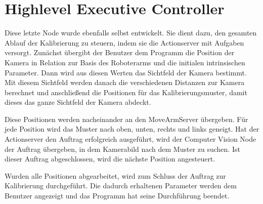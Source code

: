 \section{Highlevel Executive Controller} %
\label{sec:calibrationcontroller}
Diese letzte Node wurde ebenfalls selbst entwickelt. Sie dient dazu, den gesamten Ablauf der Kalibrierung zu steuern, indem sie die Actionserver mit Aufgaben versorgt. Zunächst übergibt der Benutzer dem Programm die Position der Kamera in Relation zur Basis des Roboterarms und die initialen intrinsischen Parameter. Dann wird aus diesen Werten das Sichtfeld der Kamera bestimmt. Mit diesem Sichtfeld werden danach die verschiedenen Distanzen zur Kamera berechnet und anschließend die Positionen für das Kalibrierungsmuster, damit dieses das ganze Sichtfeld der Kamera abdeckt.

Diese Positionen werden nacheinander an den MoveArmServer übergeben. Für jede Position wird das Muster nach oben, unten, rechts und links geneigt. Hat der Actionserver den Auftrag erfolgreich ausgeführt, wird der Computer Vision Node der Auftrag übergeben, in dem Kamerabild nach dem Muster zu suchen. Ist dieser Auftrag abgeschlossen, wird die nächste Position angesteuert.

Wurden alle Positionen abgearbeitet, wird zum Schluss der Auftrag zur Kalibrierung durchgeführt. Die dadurch erhaltenen Parameter werden dem Benutzer angezeigt und das Programm hat seine Durchführung beendet.